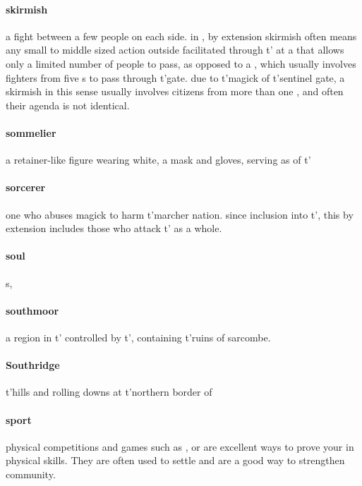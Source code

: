 \paragraph{skirmish} a fight between a few people on each side. in , by extension skirmish often means any small to middle sized action outside  facilitated through t'\allowbreak {} at a  that allows only a limited number of people to pass, as opposed to a , which usually involves fighters from five s to pass through t'\allowbreak gate. due to t'\allowbreak magick of t'\allowbreak sentinel gate, a skirmish in this sense usually involves citizens from more than one , and often their agenda is not identical.
\paragraph{sommelier} a retainer-like figure wearing white, a mask and gloves, serving as  of t'\allowbreak {}
\paragraph{sorcerer} one who abuses magick to harm t'\allowbreak marcher nation. since inclusion into t'\allowbreak {}, this by extension includes those who attack t'\allowbreak {} as a whole. 
\paragraph{soul} s, 
\paragraph{southmoor} a region in t'\allowbreak {} controlled by t'\allowbreak {}, containing t'\allowbreak ruins of sarcombe.
\paragraph{Southridge} t'\allowbreak hills and rolling downs at t'\allowbreak northern border of 
\paragraph{sport} physical competitions and games such as ,  or  are excellent ways to prove your  in physical skills. They are often used to settle  and are a good way to strengthen community. 
